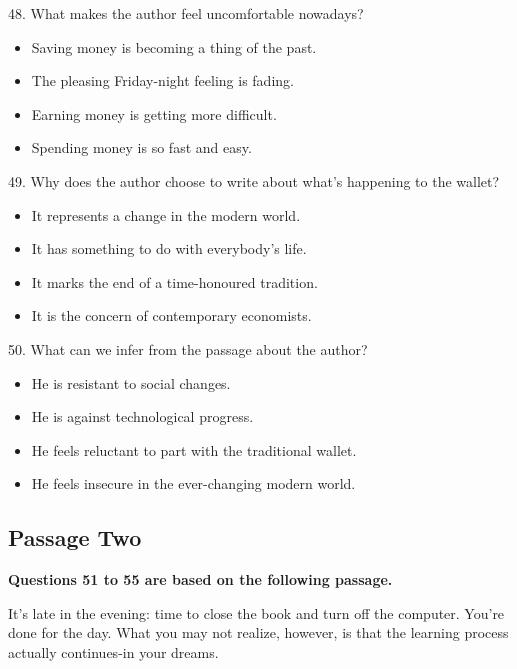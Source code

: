 \documentclass[UTF8,11pt]{ctexart}
\begin{document}
48. What makes the author feel uncomfortable nowadays?


\begin{itemize}[leftmargin=2em,itemsep=.2em,topsep=.4em]\item[A.] Saving money is becoming a thing of the past.
\item[B.] The pleasing Friday-night feeling is fading.
\item[C.] Earning money is getting more difficult.
\item[D.] Spending money is so fast and easy.
\end{itemize}

49. Why does the author choose to write about what's happening to the wallet?


\begin{itemize}[leftmargin=2em,itemsep=.2em,topsep=.4em]\item[A.] It represents a change in the modern world.
\item[B.] It has something to do with everybody's life.
\item[C.] It marks the end of a time-honoured tradition.
\item[D.] It is the concern of contemporary economists.
\end{itemize}

50. What can we infer from the passage about the author?


\begin{itemize}[leftmargin=2em,itemsep=.2em,topsep=.4em]\item[A.] He is resistant to social changes.
\item[B.] He is against technological progress.
\item[C.] He feels reluctant to part with the traditional wallet.
\item[D.] He feels insecure in the ever-changing modern world.
\end{itemize}

\subsection*{\textbf{Passage Two}}


\textbf{Questions 51 to 55 are based on the following passage.}


It's late in the evening: time to close the book and turn off the computer. You're done for the day. What you may not realize, however, is that the learning process actually continues-in your dreams.
\end{document}
